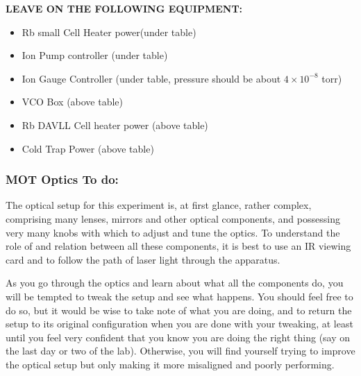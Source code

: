 \documentclass{../lab}
\begin{document}
\textbf{LEAVE ON THE FOLLOWING EQUIPMENT:}

\begin{itemize}
    \item Rb small Cell Heater power(under table)

    \item Ion Pump controller (under table)

    \item Ion Gauge Controller (under table, pressure should be about $4 \times 10^{-8}$ torr)

    \item VCO Box (above table)

    \item Rb DAVLL Cell heater power (above table)

    \item Cold Trap Power (above table)
\end{itemize}

\subsubsection{MOT Optics To do:}

The optical setup for this experiment is, at first glance, rather complex, comprising many lenses, mirrors and other optical components, and possessing very many knobs with which to adjust and tune the optics. To understand the role of and relation between all these components, it is best to use an IR viewing card and to follow the path of laser light through the apparatus.

As you go through the optics and learn about what all the components do, you will be tempted to tweak the setup and see what happens. You should feel free to do so, but it would be wise to take note of what you are doing, and to return the setup to its original configuration when you are done with your tweaking, at least until you feel very confident that you know you are doing the right thing (say on the last day or two of the lab). Otherwise, you will find yourself trying to improve the optical setup but only making it more misaligned and poorly performing.
\end{document}
